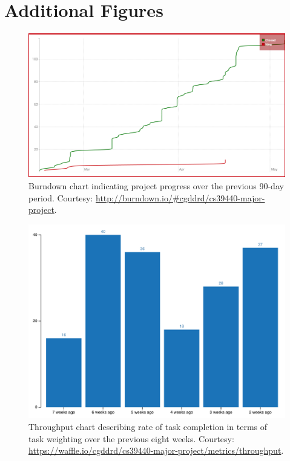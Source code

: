 \chapter{Additional Figures}

\begin{figure}[ht!]
\centering
\includegraphics[scale=0.4]{images/burndown.png}
  \caption{Burndown chart indicating project progress over the previous 90-day period. Courtesy: \protect\url{http://burndown.io/#cgddrd/cs39440-major-project}.}
\label{fig:burndown}
\end{figure} 

\begin{figure}[ht!]
\centering
\includegraphics[scale=0.5]{images/throughput.png}
  \caption{Throughput chart describing rate of task completion in terms of task weighting over the previous eight weeks. Courtesy: \protect\url{https://waffle.io/cgddrd/cs39440-major-project/metrics/throughput}.}
\label{fig:throughput}
\end{figure} 

